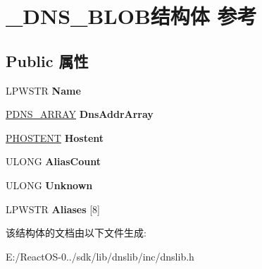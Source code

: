 \hypertarget{struct___d_n_s___b_l_o_b}{}\section{\+\_\+\+D\+N\+S\+\_\+\+B\+L\+O\+B结构体 参考}
\label{struct___d_n_s___b_l_o_b}
\subsection*{Public 属性}
\begin{DoxyCompactItemize}
\item 
\mbox{\label{struct___d_n_s___b_l_o_b_a1dc86a930b7b1d2b08a4aed602a74adb}} 
L\+P\+W\+S\+TR {\bfseries Name}
\item 
\mbox{\label{struct___d_n_s___b_l_o_b_a4234385224b36deb5a78180738ee505c}} 
\hyperlink{struct___d_n_s___a_r_r_a_y}{P\+D\+N\+S\+\_\+\+A\+R\+R\+AY} {\bfseries Dns\+Addr\+Array}
\item 
\mbox{\label{struct___d_n_s___b_l_o_b_a7611f9ccab3e09fc0e42ff5fd87c85c7}} 
\hyperlink{structhostent}{P\+H\+O\+S\+T\+E\+NT} {\bfseries Hostent}
\item 
\mbox{\label{struct___d_n_s___b_l_o_b_a0906373721a8b984a6c7d5fe06e4325c}} 
U\+L\+O\+NG {\bfseries Alias\+Count}
\item 
\mbox{\label{struct___d_n_s___b_l_o_b_af9f7309672e8e60ba882f6fd05f420a8}} 
U\+L\+O\+NG {\bfseries Unknown}
\item 
\mbox{\label{struct___d_n_s___b_l_o_b_a1744aa356a8436db008e3e3e92670ac0}} 
L\+P\+W\+S\+TR {\bfseries Aliases} \mbox{[}8\mbox{]}
\end{DoxyCompactItemize}


该结构体的文档由以下文件生成\+:\begin{DoxyCompactItemize}
\item 
E\+:/\+React\+O\+S-\/0../sdk/lib/dnslib/inc/dnslib.\+h\end{DoxyCompactItemize}
